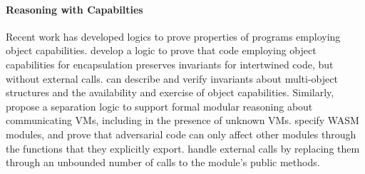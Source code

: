 \paragraph{Reasoning with Capabilties}
%
 Recent work has developed logics to prove properties of programs employing object capabilities.
\citet{ddd} develop a logic to prove that code employing object
capabilities for encapsulation preserves invariants for
intertwined code, but without external calls. 
  \citet{dd}  can describe and verify invariants
about multi-object structures and the availability and exercise of object capabilities.  %
 Similarly,
{\citet{vmsl-pldi2023} propose a separation logic to support formal modular reasoning about communicating VMs, including in the presence of unknown VMs.
\citet{irisWasm23} specify WASM modules, %
and prove that adversarial code  can only affect other modules through the functions} that they explicitly export. 
\citet{CassezFQ24}  handle external calls by replacing them through an unbounded number of calls to the module's public methods.
 
